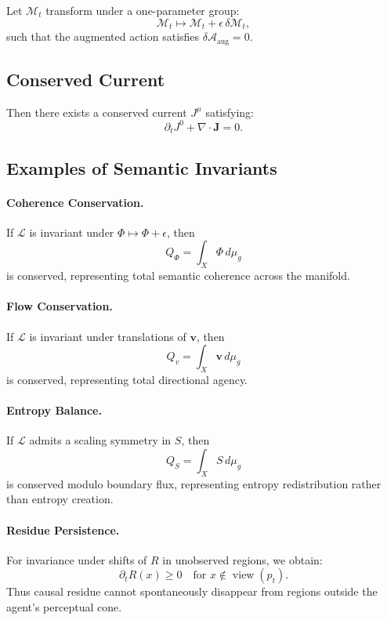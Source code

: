 \documentclass[11pt]{article}
\begin{document}
Let $\mathcal{M}_t$ transform under a one-parameter group:
\[
\mathcal{M}_t \mapsto \mathcal{M}_t + \epsilon \, \delta \mathcal{M}_t,
\]
such that the augmented action satisfies $\delta \mathcal{A}_{\text{aug}} = 0$.

\subsection{Conserved Current}

Then there exists a conserved current $J^\mu$ satisfying:
\[
\partial_t J^0 + \nabla \cdot \mathbf{J} = 0.
\]

\subsection{Examples of Semantic Invariants}

\paragraph{Coherence Conservation.}
If $\mathcal{L}$ is invariant under $\Phi \mapsto \Phi + \epsilon$, then
\[
Q_\Phi = \int_X \Phi\, d\mu_g
\]
is conserved, representing total semantic coherence across the manifold.

\paragraph{Flow Conservation.}
If $\mathcal{L}$ is invariant under translations of $\mathbf{v}$, then
\[
Q_v = \int_X \mathbf{v}\, d\mu_g
\]
is conserved, representing total directional agency.

\paragraph{Entropy Balance.}
If $\mathcal{L}$ admits a scaling symmetry in $S$, then
\[
Q_S = \int_X S\, d\mu_g
\]
is conserved modulo boundary flux, representing entropy redistribution
rather than entropy creation.

\paragraph{Residue Persistence.}
For invariance under shifts of $R$ in unobserved regions, we obtain:
\[
\partial_t R(x) \ge 0 \quad \text{for } x \notin \operatorname{view}(p_t).
\]
Thus causal residue cannot spontaneously disappear from regions outside the
agent's perceptual cone.
\end{document}
